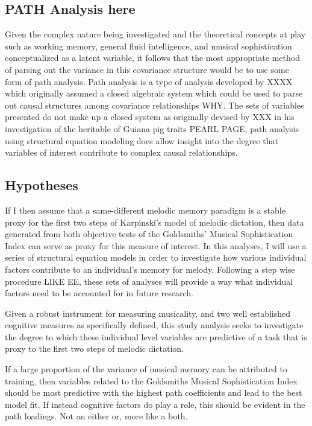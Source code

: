 \documentclass[]{book}
\begin{document}
\hypertarget{path-analysis-here}{%
\subsection{PATH Analysis here}\label{path-analysis-here}}

Given the complex nature being investigated and the theoretical concepts at play such as working memory, general fluid intelligence, and musical sophistication conceptualized as a latent variable, it follows that the most appropriate method of parsing out the variance in this covariance structure would be to use some form of path analysis.
Path analysis is a type of analysis developed by XXXX which originally assumed a closed algebraic system which could be used to parse out causal structures among covariance relationships WHY.
The sets of variables presented do not make up a closed system as originally devised by XXX in his investigation of the heritable of Guiana pig traits PEARL PAGE, path analysis using structural equation modeling does allow insight into the degree that variables of interest contribute to complex causal relationships.

\hypertarget{hypotheses}{%
\subsection{Hypotheses}\label{hypotheses}}

If I then assume that a same-different melodic memory paradigm is a stable proxy for the first two steps of Karpinski's model of melodic dictation, then data generated from both objective tests of the Goldsmiths' Musical Sophistication Index can serve as proxy for this measure of interest.
In this analyses, I will use a series of structural equation models in order to investigate how various individual factors contribute to an individual's memory for melody.
Following a step wise procedure LIKE EE, these sets of analyses will provide a way what individual factors need to be accounted for in future research.

Given a robust instrument for measuring musicality, and two well established cognitive measures as specifically defined, this study analysis seeks to investigate the degree to which these individual level variables are predictive of a task that is proxy to the first two steps of melodic dictation.

If a large proportion of the variance of musical memory can be attributed to training, then variables related to the Goldsmiths Musical Sophistication Index should be most predictive with the highest path coefficients and lead to the best model fit.
If instead cognitive factors do play a role, this should be evident in the path loadings.
Not an either or, more like a both.
\end{document}

